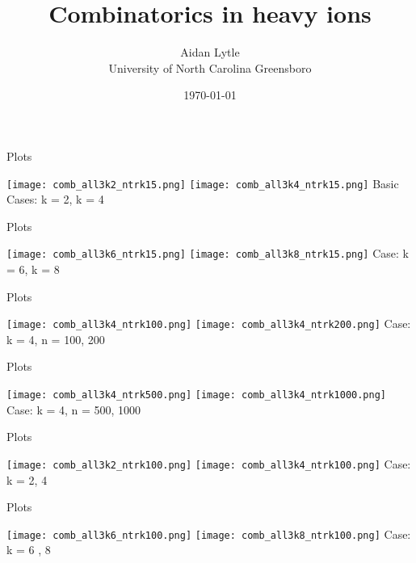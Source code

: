 \documentclass[aspectratio=169,compress,10pt]{beamer} %
\title[\today~-~Slide \insertframenumber]{Combinatorics in heavy ions}
\author[UNCG]{Aidan Lytle \\ University of North Carolina Greensboro}
\date{\today}
\begin{document}
\begin{frame}
\titlepage
\end{frame}





\begin{frame}{Plots}
\begin{adjustwidth}{-2em}{-2em}
\texttt{[image: comb\_all3k2\_ntrk15.png]}
\texttt{[image: comb\_all3k4\_ntrk15.png]}
Basic Cases: k = 2, k = 4
\end{adjustwidth}
\end{frame}

\begin{frame}{Plots}
\begin{adjustwidth}{-2em}{-2em}
\texttt{[image: comb\_all3k6\_ntrk15.png]}
\texttt{[image: comb\_all3k8\_ntrk15.png]}
Case: k = 6, k = 8
\end{adjustwidth}
\end{frame}

\begin{frame}{Plots}
\begin{adjustwidth}{-2em}{-2em}
\texttt{[image: comb\_all3k4\_ntrk100.png]}
\texttt{[image: comb\_all3k4\_ntrk200.png]}
Case: k = 4, n = 100, 200
\end{adjustwidth}
\end{frame}

\begin{frame}{Plots}
\begin{adjustwidth}{-2em}{-2em}
\texttt{[image: comb\_all3k4\_ntrk500.png]}
\texttt{[image: comb\_all3k4\_ntrk1000.png]}
Case: k = 4, n = 500, 1000
\end{adjustwidth}
\end{frame}

\begin{frame}{Plots}
\begin{adjustwidth}{-2em}{-2em}
\texttt{[image: comb\_all3k2\_ntrk100.png]}
\texttt{[image: comb\_all3k4\_ntrk100.png]}
Case: k = 2, 4
\end{adjustwidth}
\end{frame}

\begin{frame}{Plots}
\begin{adjustwidth}{-2em}{-2em}
\texttt{[image: comb\_all3k6\_ntrk100.png]}
\texttt{[image: comb\_all3k8\_ntrk100.png]}
Case: k = 6 , 8
\end{adjustwidth}
\end{frame}
\end{document}
